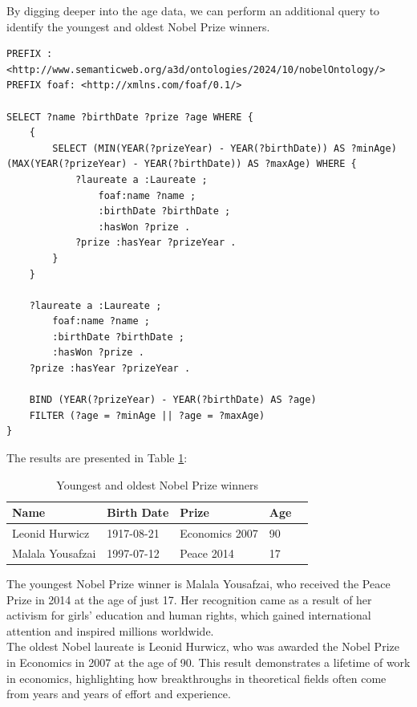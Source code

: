 \documentclass{article}
\begin{document}
\newpage

By digging deeper into the age data, we can perform an additional query to identify the youngest and oldest
Nobel Prize winners.

\begin{lstlisting}
PREFIX : <http://www.semanticweb.org/a3d/ontologies/2024/10/nobelOntology/>
PREFIX foaf: <http://xmlns.com/foaf/0.1/>

SELECT ?name ?birthDate ?prize ?age WHERE {
    {
        SELECT (MIN(YEAR(?prizeYear) - YEAR(?birthDate)) AS ?minAge) (MAX(YEAR(?prizeYear) - YEAR(?birthDate)) AS ?maxAge) WHERE {
            ?laureate a :Laureate ;
                foaf:name ?name ;
                :birthDate ?birthDate ;
                :hasWon ?prize .
            ?prize :hasYear ?prizeYear .
        }
    }

    ?laureate a :Laureate ;
        foaf:name ?name ;
        :birthDate ?birthDate ;
        :hasWon ?prize .
    ?prize :hasYear ?prizeYear .

    BIND (YEAR(?prizeYear) - YEAR(?birthDate) AS ?age)
    FILTER (?age = ?minAge || ?age = ?maxAge)
}
\end{lstlisting}

\vspace{1em}

The results are presented in Table \ref{tab:youngest_oldest}:

\begin{table}[H]
	\centering
	\caption{Youngest and oldest Nobel Prize winners}
	\begin{tabular}{|l|l|l|l|c|}
		\hline
		\textbf{Name}    & \textbf{Birth Date} & \textbf{Prize} & \textbf{Age} \\ \hline
		Leonid Hurwicz   & 1917-08-21          & Economics 2007 & 90           \\ \hline
		Malala Yousafzai & 1997-07-12          & Peace 2014     & 17           \\ \hline
	\end{tabular}
	\label{tab:youngest_oldest}
\end{table}

The youngest Nobel Prize winner is Malala Yousafzai, who received the Peace Prize in 2014 at the age of just 17.
Her recognition came as a result of her activism for girls' education and human rights, which gained international
attention and inspired millions worldwide.\\
The oldest Nobel laureate is Leonid Hurwicz, who was awarded the Nobel Prize in Economics in 2007 at the age of 90.
This result demonstrates a lifetime of work in economics, highlighting how breakthroughs in theoretical fields
often come from years and years of effort and experience.
\end{document}
